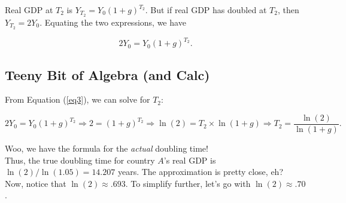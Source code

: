 \documentclass[11pt]{article}\usepackage[]{graphicx}\usepackage[]{color}
\begin{document}
\begin{center}
	

\end{center}

Real GDP at $T_2$ is $Y_{T_2} = Y_0(1+g)^{T_2}$. But if real GDP has doubled at $T_2$, then $Y_{T_2} = 2Y_0$. Equating the two expressions, we have

\begin{equation}
\label{eq3}
2Y_0 = Y_0(1+g)^{T_2}.
\end{equation}

\newpage

\subsection*{Teeny Bit of Algebra (and Calc)}

From Equation (\ref{eq3}), we can solve for $T_2$:

\[2Y_0 = Y_0(1+g)^{T_2} \Rightarrow 2 = (1+g)^{T_2} \Rightarrow \ln(2) = T_2 \times \ln(1+g)\Rightarrow T_2 = \frac{\ln(2)}{\ln(1+g)}.\]

Woo, we have the formula for the \textit{actual} doubling time!
\\

Thus, the true doubling time for country $A$'s real GDP is $\ln(2)/\ln(1.05) = 14.207$ years. The approximation is pretty close, eh?
\\

Now, notice that $\ln(2) \approx .693$. To simplify further, let's go with $\ln(2) \approx .70$. 
\\
\end{document}
